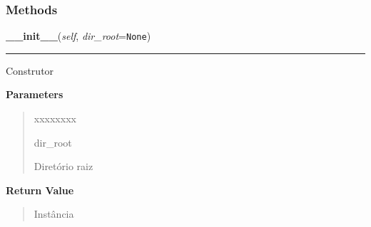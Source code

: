 
  \subsubsection{Methods}

    \label{pygame-asteroids:resource_manager:ResourceManager:__init__}

    \vspace{0.5ex}

\hspace{.8\funcindent}\begin{boxedminipage}{\funcwidth}

    \raggedright \textbf{\_\_init\_\_}(\textit{self}, \textit{dir\_root}={\tt None})

    \vspace{-1.5ex}

    \rule{\textwidth}{0.5\fboxrule}
\setlength{\parskip}{2ex}
    Construtor

\setlength{\parskip}{1ex}
      \textbf{Parameters}
      \vspace{-1ex}

      \begin{quote}
        \begin{Ventry}{xxxxxxxx}

          \item[dir\_root]

          Diretório raiz

        \end{Ventry}

      \end{quote}

      \textbf{Return Value}
    \vspace{-1ex}

      \begin{quote}
      Instância

      \end{quote}

    \end{boxedminipage}

